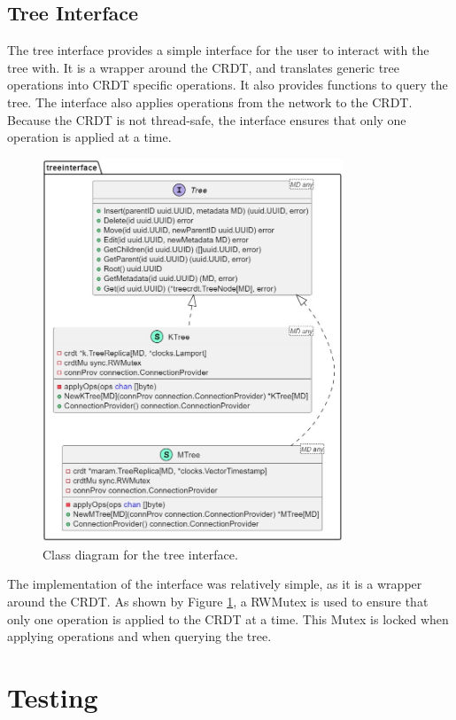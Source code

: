 \documentclass[12pt]{report}
\begin{document}
\section{Tree Interface}
The tree interface provides a simple interface for the user to interact with the tree with. It is a wrapper around the CRDT, and translates generic tree operations into CRDT specific operations. It also provides functions to query the tree. The interface also applies operations from the network to the CRDT. Because the CRDT is not thread-safe, the interface ensures that only one operation is applied at a time. \par
\begin{figure}[H]
    \centering
    \includegraphics[width=0.8\textwidth]{images/treeinterface_impl.jpg}
    \caption{Class diagram for the tree interface.}
    \label{fig:treeimpl}
\end{figure}
The implementation of the interface was relatively simple, as it is a wrapper around the CRDT. As shown by Figure \ref{fig:treeimpl}, a RWMutex is used to ensure that only one operation is applied to the CRDT at a time. This Mutex is locked when applying operations and when querying the tree. \par




\chapter{Testing}
\end{document}
